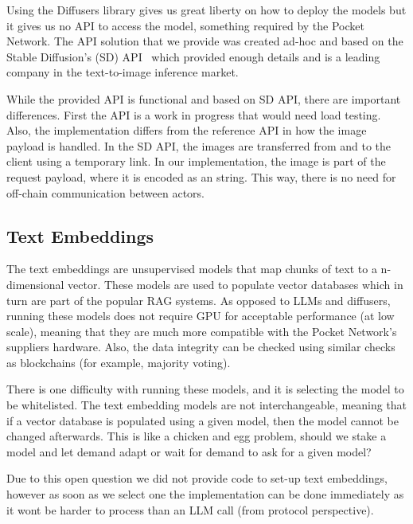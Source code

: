 Using the Diffusers library gives us great liberty on how to deploy the models but it gives us no API to access the model, something required by the Pocket Network. The API solution that we provide was created ad-hoc and based on the Stable Diffusion's (SD) API~\cite{StableDiffusion_API} which provided enough details and is a leading company in the text-to-image inference market.

While the provided API is functional and based on SD API, there are important differences. First the API is a work in progress that would need load testing. Also, the implementation differs from the reference API in how the image payload is handled. In the SD API, the images are transferred from and to the client using a temporary link. In our implementation, the image is part of the request payload, where it is encoded as an string. This way, there is no need for off-chain communication between actors.

\subsection{Text Embeddings}
The text embeddings are unsupervised models that map chunks of text to a n-dimensional vector. These models are used to populate vector databases which in turn are part of the popular RAG systems. As opposed to LLMs and diffusers, running these models does not require GPU for acceptable performance (at low scale), meaning that they are much more compatible with the Pocket Network's suppliers hardware. Also, the data integrity can be checked using similar checks as blockchains (for example, majority voting).

There is one difficulty with running these models, and it is selecting the model to be whitelisted. The text embedding models are not interchangeable, meaning that if a vector database is populated using a given model, then the model cannot be changed afterwards. This is like a chicken and egg problem, should we stake a model and let demand adapt or wait for demand to ask for a given model?

Due to this open question we did not provide code to set-up text embeddings, however as soon as we select one the implementation can be done immediately as it wont be harder to process than an LLM call (from protocol perspective).



